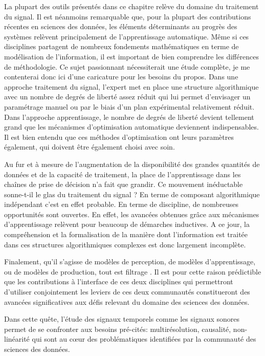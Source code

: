 La plupart des outils présentés dans ce chapitre relève du domaine du traitement du signal. Il est néanmoins remarquable que, pour la plupart des contributions récentes en sciences des données, les éléments déterminants au progrès des systèmes relèvent principalement de l'apprentissage automatique. Même si ces disciplines partagent de nombreux fondements mathématiques en terme de modélisation de l'information, il est important de bien comprendre les différences de méthodologie. Ce sujet passionnant nécessiterait une étude complète, je me contenterai donc ici d'une caricature pour les besoins du propos. Dans une approche traitement du signal, l'expert met en place une structure algorithmique avec un nombre de degrés de liberté assez réduit qui lui permet d'envisager un paramétrage manuel ou par le biais d'un plan expérimental relativement réduit. Dans l'approche apprentissage, le nombre de degrés de liberté devient tellement grand que les mécanismes d'optimisation automatique deviennent indispensables. Il est bien entendu que ces méthodes d'optimisation ont leurs paramètres également, qui doivent être également choisi avec soin.

Au fur et à mesure de l'augmentation de la disponibilité des grandes quantités de données et de la capacité de traitement, la place de l'apprentissage dans les chaînes de prise de décision n'a fait que grandir. Ce mouvement inéductable sonne-t-il le glas du traitement du signal ? En terme de composant algorithmique indépendant c'est en effet probable. En terme de discipline, de nombreuses opportunités sont ouvertes. En effet, les avancées obtenues grâce aux mécanismes d'apprentissage relèvent pour beaucoup de démarches inductives. A ce jour, la compréhension et la formalisation de la manière dont l'information est traitée dans ces structures algorithmiques complexes est donc largement incomplète.

Finalement, qu'il s'agisse de modèles de perception, de modèles d'apprentissage, ou de modèles de production, \og tout est filtrage \fg. Il est pour cette raison prédictible que les contributions à l'interface de ces deux disciplines qui permettront d'utiliser conjointement les leviers de ces deux communautés constitueront des avancées significatives aux défis relevant du domaine des sciences des données.~\cite{mallat2016understanding}

Dans cette quête, l'étude des signaux temporels comme les signaux sonores permet de se confronter aux besoins pré-cités: multirésolution, causalité, non-linéarité qui sont au c\oe{}ur des problématiques identifiées par la communauté des sciences des données.

